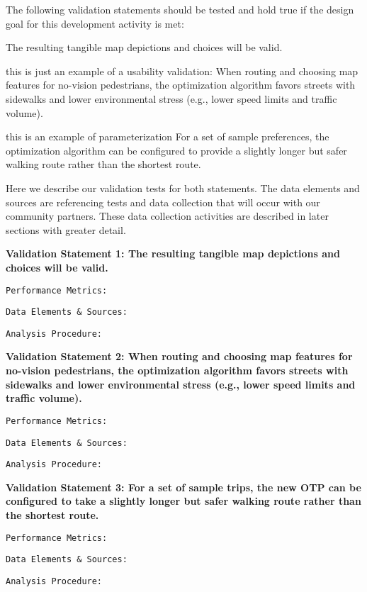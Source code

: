 The following validation statements should be tested and hold true if the design goal for this development activity is met: 

The resulting tangible map depictions and choices will be valid.

\ac{this is just an example of a usability validation:}
When routing and choosing map features for no-vision pedestrians, the optimization algorithm favors streets with sidewalks and lower environmental stress (e.g., lower speed limits and traffic volume).

\ac{this is an example of parameterization}
For a set of sample preferences, the optimization algorithm can be configured to provide a slightly longer but safer walking route rather than the shortest route.


Here we describe our validation tests for both statements. The data elements and sources are referencing tests and data collection that will occur with our community partners. These data collection activities are described in later sections with greater detail.

\textbf{Validation Statement 1:
The resulting tangible map depictions and choices will be valid.}

\texttt{Performance Metrics:} 

\texttt{Data Elements \& Sources:}

\texttt{Analysis Procedure:}

\textbf{Validation Statement 2:
When routing and choosing map features for no-vision pedestrians, the optimization algorithm favors streets with sidewalks and lower environmental stress (e.g., lower speed limits and traffic volume).
}

\texttt{Performance Metrics:} 

\texttt{Data Elements \& Sources:}

\texttt{Analysis Procedure:}

\textbf{Validation Statement 3:
For a set of sample trips, the new OTP can be configured to take a slightly longer but safer walking route rather than the shortest route.
}

\texttt{Performance Metrics:} 

\texttt{Data Elements \& Sources:}

\texttt{Analysis Procedure:}

\label{sec:mapping-validation}


